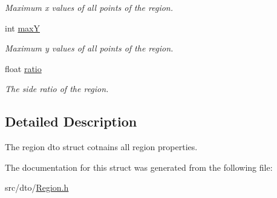 \begin{DoxyCompactItemize}
\begin{DoxyCompactList}\small\item\em Maximum x values of all points of the region. \end{DoxyCompactList}\item 
\mbox{\label{structdto_1_1_region_a6c217c75672c91d607c29edea9a209d0}} 
int \mbox{\hyperlink{structdto_1_1_region_a6c217c75672c91d607c29edea9a209d0}{maxY}}
\begin{DoxyCompactList}\small\item\em Maximum y values of all points of the region. \end{DoxyCompactList}\item 
\mbox{\label{structdto_1_1_region_abdd4069cd29b52c9c0512e6b28fb4fa2}} 
float \mbox{\hyperlink{structdto_1_1_region_abdd4069cd29b52c9c0512e6b28fb4fa2}{ratio}}
\begin{DoxyCompactList}\small\item\em The side ratio of the region. \end{DoxyCompactList}\end{DoxyCompactItemize}


\subsection{Detailed Description}
The region dto struct cotnains all region properties. 

The documentation for this struct was generated from the following file\+:\begin{DoxyCompactItemize}
\item 
src/dto/\mbox{\hyperlink{_region_8h}{Region.\+h}}\end{DoxyCompactItemize}
